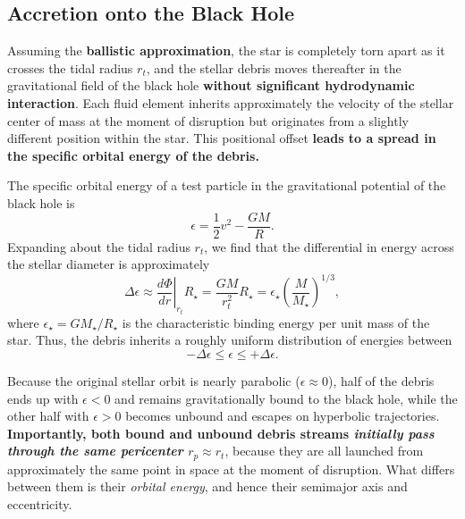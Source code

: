 \subsection{Accretion onto the Black Hole}

Assuming the \textbf{ballistic approximation}, the star is completely torn apart as it crosses the tidal radius $r_t$, and the stellar debris moves thereafter in the gravitational field of the black hole \textbf{without significant hydrodynamic interaction}. Each fluid element inherits approximately the velocity of the stellar center of mass at the moment of disruption but originates from a slightly different position within the star. This positional offset \textbf{leads to a spread in the specific orbital energy of the debris.}

The specific orbital energy of a test particle in the gravitational potential of the black hole is
\[
\epsilon = \frac{1}{2}v^2 - \frac{GM}{R}.
\]
Expanding about the tidal radius $r_t$, we find that the differential in energy across the stellar diameter is approximately
\[
\Delta \epsilon \approx \left.\frac{d\Phi}{dr}\right|_{r_t} R_\star = \frac{GM}{r_t^2} R_\star = \epsilon_\star \left(\frac{M}{M_\star}\right)^{1/3},
\]
where $\epsilon_\star = GM_\star / R_\star$ is the characteristic binding energy per unit mass of the star. Thus, the debris inherits a roughly uniform distribution of energies between
\[
-\Delta \epsilon \leq \epsilon \leq +\Delta \epsilon.
\]

Because the original stellar orbit is nearly parabolic ($\epsilon \approx 0$), half of the debris ends up with $\epsilon < 0$ and remains gravitationally bound to the black hole, while the other half with $\epsilon > 0$ becomes unbound and escapes on hyperbolic trajectories. \textbf{Importantly, both bound and unbound debris streams \emph{initially pass through the same pericenter} $r_p \approx r_t$}, because they are all launched from approximately the same point in space at the moment of disruption. What differs between them is their \emph{orbital energy}, and hence their semimajor axis and eccentricity.


